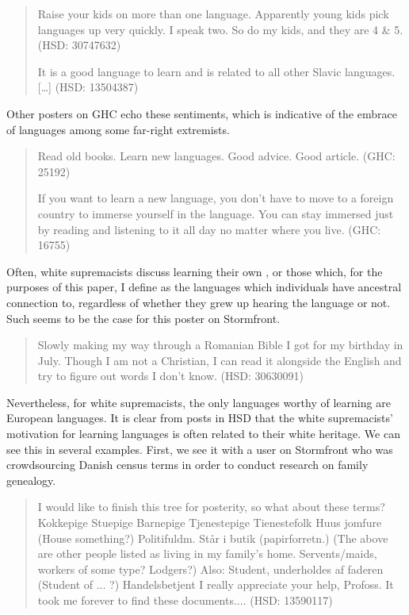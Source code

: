 \documentclass[output=paper,colorlinks,citecolor=brown]{langscibook}
\begin{document}
\begin{quote} Raise your kids on more than one language. Apparently young kids pick languages up very quickly. I speak two. So do my kids, and they are 4 \& 5. (HSD: 30747632)

It is a good language to learn and is related to all other Slavic languages. {[}\ldots{]} (HSD: 13504387) 
\end{quote}

\noindent Other posters on GHC echo these sentiments, which is indicative of the embrace of languages among some far-right extremists.

\begin{quote} 
Read old books. Learn new languages. Good advice. Good article. (GHC: 25192)

If you want to learn a new language, you don't have to move to a foreign country to immerse yourself in the language. You can stay immersed just by reading and listening to it all day no matter where you live. (GHC: 16755) \end{quote}

Often, white supremacists discuss learning their own , or those which, for the purposes of this paper, I define as the languages which individuals have ancestral connection to, regardless of whether they grew up hearing the language or not. Such seems to be the case for this poster on Stormfront.

\begin{quote} 
Slowly making my way through a Romanian Bible I got for my birthday in July. Though I am not a Christian, I can read it alongside the English and try to figure out words I don't know. (HSD: 30630091) 
\end{quote}

\noindent Nevertheless, for white supremacists, the only languages worthy of learning are European languages. It is clear from posts in HSD that the white supremacists' motivation for learning languages is often related to their white heritage. We can see this in several examples. First, we see it with a user on Stormfront who was crowdsourcing Danish census terms in order to conduct research on family genealogy.

\begin{quote} 
I would like to finish this tree for posterity, so what about these terms? Kok\-ke\-pige Stuepige Barnepige Tjenestepige Tienestefolk Huus jom\-fure (House some\-thing?) Politifuldm. Står i butik (papirforretn.) (The above are other people listed as living in my family's home. Servents/maids, workers of some type? Lodgers?) Also: Student, underholdes af faderen (Student of ... ?) Handelsbetjent I really appreciate your help, Profoss. It took me forever to find these documents.... (HSD: 13590117) 
\end{quote}
\end{document}
